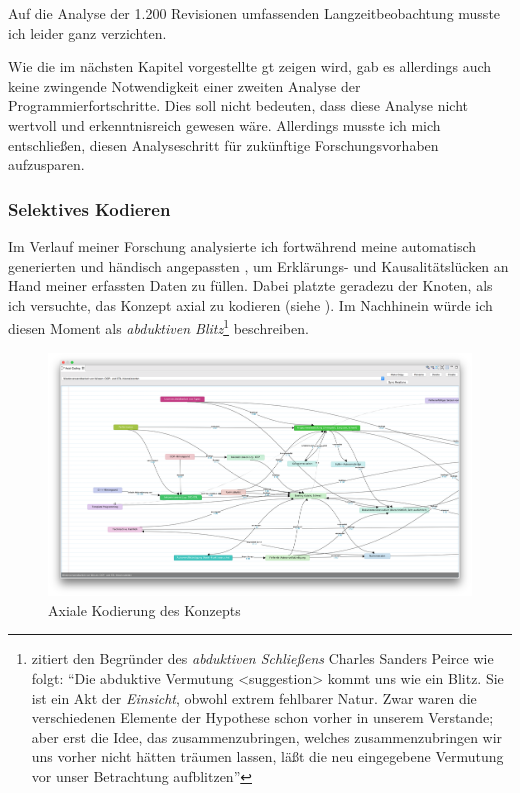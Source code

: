 Auf die Analyse der 1.200 Revisionen umfassenden Langzeitbeobachtung musste ich leider ganz verzichten.

Wie die im nächsten Kapitel vorgestellte \gls{gt} zeigen wird, gab es allerdings auch keine zwingende Notwendigkeit einer zweiten Analyse der Programmierfortschritte. Dies soll nicht bedeuten, dass diese Analyse nicht wertvoll und erkenntnisreich gewesen wäre. Allerdings musste ich mich entschließen, diesen Analyseschritt für zukünftige Forschungsvorhaben aufzusparen.



\subsubsection{Selektives Kodieren}

Im Verlauf meiner Forschung analysierte ich fortwährend meine automatisch generierten und händisch angepassten , um Erklärungs- und Kausalitätslücken an Hand meiner erfassten Daten zu füllen. Dabei platzte geradezu der Knoten, als ich versuchte, das Konzept  axial zu kodieren (siehe ). Im Nachhinein würde ich diesen Moment als \textit{abduktiven Blitz}\footnote{\cite{Strubing:2005ve} zitiert den Begründer des \textit{abduktiven Schließens} Charles Sanders Peirce wie folgt: ``Die abduktive Vermutung <suggestion> kommt uns wie ein Blitz. Sie ist ein Akt der \textit{Einsicht}, obwohl extrem fehlbarer Natur. Zwar waren die verschiedenen Elemente der Hypothese schon vorher in unserem Verstande; aber erst die Idee, das zusammenzubringen, welches zusammenzubringen wir uns vorher nicht hätten träumen lassen, läßt die neu eingegebene Vermutung vor unser Betrachtung aufblitzen''} beschreiben. \label{sec:abduktiver-blitz}

\begin{figure}
\begin{minipage}{\textwidth}
  \centering
    \includegraphics[width=1.0\linewidth]{Figures/acm/stl-inconcistencies-old.png}
  \caption{Axiale Kodierung des Konzepts }
  \label{fig:research-gt-vorlage}
\end{minipage}
\end{figure}

